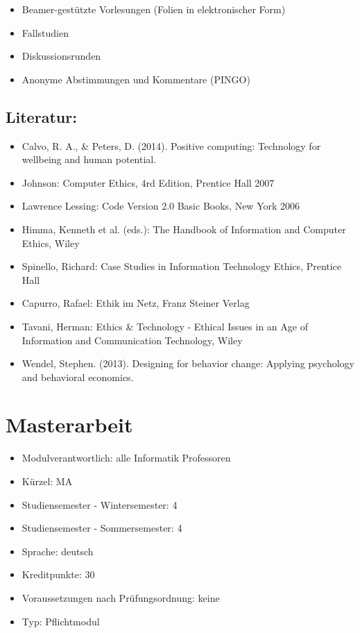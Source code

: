 \begin{itemize}
\tightlist
\item
  Beamer-gestützte Vorlesungen (Folien in elektronischer Form)
\item
  Fallstudien
\item
  Diskussionsrunden
\item
  Anonyme Abstimmungen und Kommentare (PINGO)
\end{itemize}

\section*{Literatur:}\label{literatur}

\begin{itemize}
\tightlist
\item
  Calvo, R. A., \& Peters, D. (2014). Positive computing: Technology for
  wellbeing and human potential.
\item
  Johnson: Computer Ethics, 4rd Edition, Prentice Hall 2007
\item
  Lawrence Lessing: Code Version 2.0 Basic Books, New York 2006
\item
  Himma, Kenneth et al. (eds.): The Handbook of Information and Computer
  Ethics, Wiley
\item
  Spinello, Richard: Case Studies in Information Technology Ethics,
  Prentice Hall
\item
  Capurro, Rafael: Ethik im Netz, Franz Steiner Verlag
\item
  Tavani, Herman: Ethics \& Technology - Ethical Issues in an Age of
  Information and Communication Technology, Wiley
\item
  Wendel, Stephen. (2013). Designing for behavior change: Applying
  psychology and behavioral economics.
\end{itemize}

\chapter{Masterarbeit}\label{masterarbeit}

\begin{itemize}
\tightlist
\item
  Modulverantwortlich: alle Informatik Professoren
\item
  Kürzel: MA
\item
  Studiensemester - Wintersemester: 4
\item
  Studiensemester - Sommersemester: 4
\item
  Sprache: deutsch
\item
  Kreditpunkte: 30
\item
  Voraussetzungen nach Prüfungsordnung: keine
\item
  Typ: Pflichtmodul
\end{itemize}

